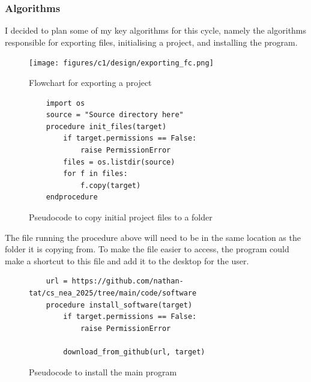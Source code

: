 \documentclass[11pt]{article}
\begin{document}
            \subsubsection{Algorithms}
                I decided to plan some of my key algorithms for this cycle, namely the algorithms responsible for exporting files, initialising a project, and installing the program.

                \begin{figure}[!ht]
                    \centering
                    \texttt{[image: figures/c1/design/exporting\_fc.png]}
                    \caption{Flowchart for exporting a project}
                    \label{fig:exporting_fc_c1}
                \end{figure}
                

                \begin{figure}[!ht]
                    \begin{verbatim}
    import os
    source = "Source directory here"
    procedure init_files(target)
        if target.permissions == False:
            raise PermissionError
        files = os.listdir(source)
        for f in files:
            f.copy(target)
    endprocedure
                    \end{verbatim}
                    \caption{Pseudocode to copy initial project files to a folder}
                    \label{pc:copy_to_folder_ps_c1}
                \end{figure}


                The file running the procedure above will need to be in the same location as the folder it is copying from. To make the file easier to access, the program could make a shortcut to this file and add it to the desktop for the user.
                

                \begin{figure}[!ht]
                    \begin{verbatim}
    url = https://github.com/nathan-tat/cs_nea_2025/tree/main/code/software
    procedure install_software(target)
        if target.permissions == False:
            raise PermissionError
        
        download_from_github(url, target)
                    \end{verbatim}
                    \caption{Pseudocode to install the main program}
                    \label{pc:install_software_ps_c1}
                \end{figure}
\end{document}
